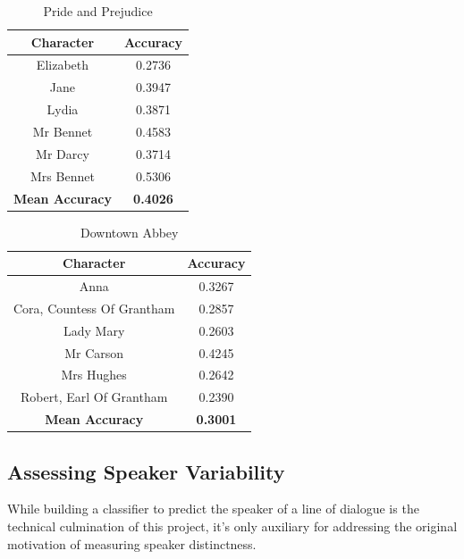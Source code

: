 \documentclass{article}
\begin{document}
\begin{titlepage}
\begin{table}[H]
    \centering
    \begin{tabular}{|c|c|}
        \hline
        \textbf{Character} & \textbf{Accuracy} \\
        \hline
        Elizabeth & 0.2736 \\
        \hline
        Jane & 0.3947 \\
        \hline
        Lydia & 0.3871 \\
        \hline
        Mr Bennet & 0.4583 \\
        \hline
        Mr Darcy & 0.3714 \\
        \hline
        Mrs Bennet & 0.5306 \\
        \hline
        \textbf{Mean Accuracy} & \textbf{0.4026} \\
        \hline
    \end{tabular}
    \caption{Pride and Prejudice}
    \label{tab:pride_and_prejudice_accuracy}
\end{table}

\begin{table}[H]
    \centering
    \begin{tabular}{|c|c|}
        \hline
        \textbf{Character} & \textbf{Accuracy} \\
        \hline
        Anna & 0.3267 \\
        \hline
        Cora, Countess Of Grantham & 0.2857 \\
        \hline
        Lady Mary & 0.2603 \\
        \hline
        Mr Carson & 0.4245 \\
        \hline
        Mrs Hughes & 0.2642 \\
        \hline
        Robert, Earl Of Grantham & 0.2390 \\
        \hline
        \textbf{Mean Accuracy} & \textbf{0.3001} \\
        \hline
    \end{tabular}
    \caption{Downtown Abbey}
    \label{tab:downtown_abbey_accuracy}
\end{table}

\subsection{Assessing Speaker Variability}
While building a classifier to predict the speaker of a line of dialogue is the technical culmination of this project, it's only auxiliary for addressing the original motivation of measuring speaker distinctness.


\end{titlepage}
\end{document}
